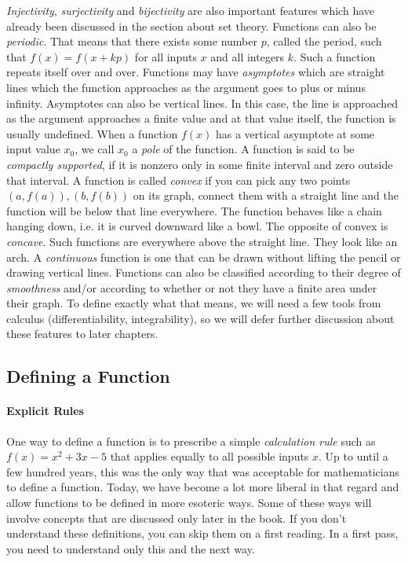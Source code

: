 \emph{Injectivity}, \emph{surjectivity} and \emph{bijectivity} are also important features which have already been discussed in the section about set theory. Functions can also be \emph{periodic}. That means that there exists some number $p$, called the period, such that $f(x) = f(x + k p)$ for all inputs $x$ and all integers $k$. Such a function repeats itself over and over. Functions may have \emph{asymptotes} which are straight lines which the function approaches as the argument goes to plus or minus infinity. Asymptotes can also be vertical lines. In this case, the line is approached as the argument approaches a finite value and at that value itself, the function is usually undefined. When a function $f(x)$ has a vertical asymptote at some input value $x_0$, we call $x_0$ a \emph{pole} of the function. A function is said to be \emph{compactly supported}, if it is nonzero only in some finite interval and zero outside that interval. A function is called \emph{convex} if you can pick any two points $(a,f(a)),(b,f(b))$ on its graph, connect them with a straight line and the function will be below that line everywhere. The function behaves like a chain hanging down, i.e. it is curved downward like a bowl. The opposite of convex is \emph{concave}. Such functions are everywhere above the straight line. They look like an arch. A \emph{continuous} function is one that can be drawn without lifting the pencil or drawing vertical lines. Functions can also be classified according to their degree of \emph{smoothness} and/or according to whether or not they have a finite area under their graph. To define exactly what that means, we will need a few tools from calculus (differentiability, integrability), so we will defer further discussion about these features to later chapters.


\subsection{Defining a Function}

\paragraph{Explicit Rules}
One way to define a function is to prescribe a simple \emph{calculation rule} such as $f(x) = x^2 + 3 x - 5$ that applies equally to all possible inputs $x$. Up to until a few hundred years, this was the only way that was acceptable for mathematicians to define a function. Today, we have become a lot more liberal in that regard and allow functions to be defined in more esoteric ways. Some of these ways will involve concepts that are discussed only later in the book. If you don't understand these definitions, you can skip them on a first reading. In a first pass, you need to understand only this and the next way.

